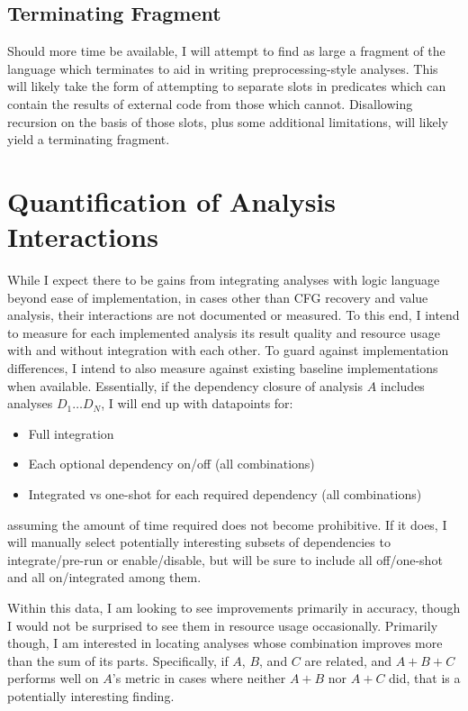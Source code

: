 \subsection{Terminating Fragment}
Should more time be available, I will attempt to find as large a fragment of the language which terminates to aid in writing preprocessing-style analyses.
This will likely take the form of attempting to separate slots in predicates which can contain the results of external code from those which cannot.
Disallowing recursion on the basis of those slots, plus some additional limitations, will likely yield a terminating fragment.

\section{Quantification of Analysis Interactions}
While I expect there to be gains from integrating analyses with logic language beyond ease of implementation, in cases other than CFG recovery and value analysis,\cite{jakstab} their interactions are not documented or measured.
To this end, I intend to measure for each implemented analysis its result quality and resource usage with and without integration with each other.
To guard against implementation differences, I intend to also measure against existing baseline implementations when available.
Essentially, if the dependency closure of analysis $A$ includes analyses $D_1 \ldots D_N$, I will  end up with datapoints for:
\begin{itemize}
        \item Full integration
        \item Each optional dependency on/off (all combinations)
        \item Integrated vs one-shot for each required dependency (all combinations)
\end{itemize}
assuming the amount of time required does not become prohibitive.
If it does, I will manually select potentially interesting subsets of dependencies to integrate/pre-run or enable/disable, but will be sure to include all off/one-shot and all on/integrated among them.

Within this data, I am looking to see improvements primarily in accuracy, though I would not be surprised to see them in resource usage occasionally.
Primarily though, I am interested in locating analyses whose combination improves more than the sum of its parts.
Specifically, if $A$, $B$, and $C$ are related, and $A + B + C$ performs well on $A$'s metric in cases where neither $A + B$ nor $A + C$ did, that is a potentially interesting finding.

